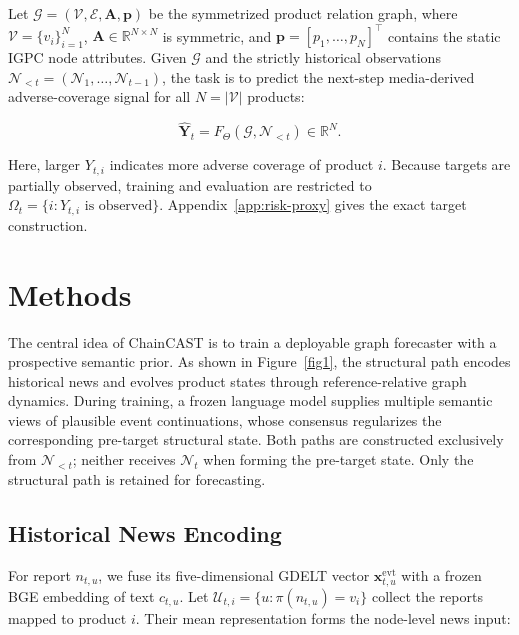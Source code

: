 \documentclass[letterpaper]{article} %
\begin{document}
Let \(\mathcal G=(\mathcal V,\mathcal E,\mathbf A,\mathbf p)\) be the symmetrized product relation graph, where \(\mathcal V=\{v_i\}_{i=1}^{N}\), \(\mathbf A\in\mathbb R^{N\times N}\) is symmetric, and \(\mathbf p=[p_1,\ldots,p_N]^\top\) contains the static IGPC node attributes. Given \(\mathcal G\) and the strictly historical observations \(\mathcal N_{<t}=(\mathcal N_1,\ldots,\mathcal N_{t-1})\), the task is to predict the next-step media-derived adverse-coverage signal for all \(N=|\mathcal V|\) products:

\begin{equation}
\widehat{\mathbf Y}_{t}
=F_\Theta\!\left(\mathcal G,\mathcal N_{<t}\right)
\in\mathbb R^N.
\label{eq:problem}
\end{equation}

Here, larger \(Y_{t,i}\) indicates more adverse coverage of product \(i\). Because targets are partially observed, training and evaluation are restricted to \(\Omega_t=\{i:Y_{t,i}\text{ is observed}\}\). Appendix~\ref{app:risk-proxy} gives the exact target construction.



\section{Methods}

The central idea of ChainCAST is to train a deployable graph forecaster with a prospective semantic prior. As shown in Figure~\ref{fig1}, the structural path encodes historical news and evolves product states through reference-relative graph dynamics. During training, a frozen language model supplies multiple semantic views of plausible event continuations, whose consensus regularizes the corresponding pre-target structural state. Both paths are constructed exclusively from \(\mathcal N_{<t}\); neither receives \(\mathcal N_t\) when forming the pre-target state. Only the structural path is retained for forecasting.

\subsection{Historical News Encoding}

For report \(n_{t,u}\), we fuse its five-dimensional GDELT vector \(\mathbf x^{\mathrm{evt}}_{t,u}\) with a frozen BGE embedding of text \(c_{t,u}\). Let \(\mathcal U_{t,i}=\{u:\pi(n_{t,u})=v_i\}\) collect the reports mapped to product \(i\). Their mean representation forms the node-level news input:
\end{document}
